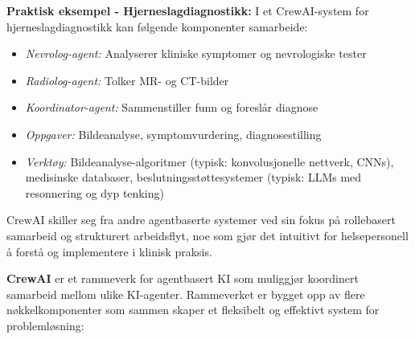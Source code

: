 \begin{eksempelbox}
\textbf{Praktisk eksempel - Hjerneslagdiagnostikk:}
I et CrewAI-system for hjerneslagdiagnostikk kan følgende komponenter samarbeide:
\begin{itemize}
\item \textit{Nevrolog-agent:} Analyserer kliniske symptomer og nevrologiske tester
\item \textit{Radiolog-agent:} Tolker MR- og CT-bilder
\item \textit{Koordinator-agent:} Sammenstiller funn og foreslår diagnose
\item \textit{Oppgaver:} Bildeanalyse, symptomvurdering, diagnosestilling
\item \textit{Verktøy:} Bildeanalyse-algoritmer (typisk: konvolusjonelle nettverk, CNNs), medisinske databaser, beslutningsstøttesystemer (typisk: LLMs med resonnering og dyp tenking)
\end{itemize}
\end{eksempelbox}

\vspace{2mm}

\noindent CrewAI skiller seg fra andre agentbaserte systemer ved sin fokus på rollebasert samarbeid og strukturert arbeidsflyt, noe som gjør det intuitivt for helsepersonell å forstå og implementere i klinisk praksis.



\noindent \textbf{CrewAI} er et rammeverk for agentbasert KI som muliggjør koordinert samarbeid mellom ulike KI-agenter. Rammeverket er bygget opp av flere nøkkelkomponenter som sammen skaper et fleksibelt og effektivt system for problemløsning:

